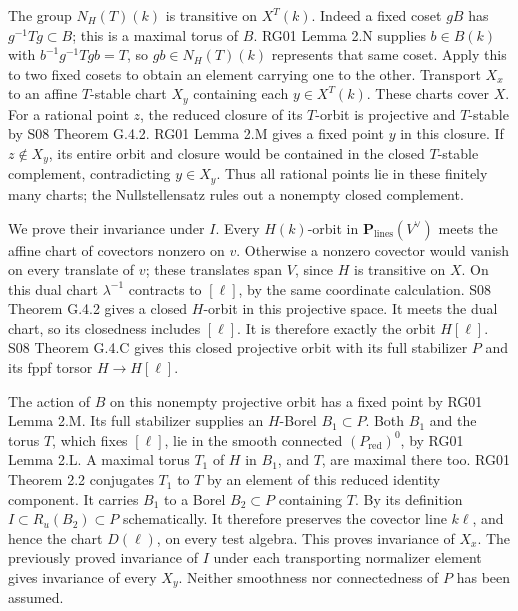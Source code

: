 \documentclass[11pt,a4paper,openany]{report}
\newcounter{none}
\begin{document}
The group \(N_H(T)(k)\) is transitive on \(X^T(k)\). Indeed a fixed coset \(gB\) has \(g^{-1}Tg\subset B\); this is a maximal torus of \(B\). RG01 Lemma 2.N supplies \(b\in B(k)\) with \(b^{-1}g^{-1}Tgb=T\), so \(gb\in N_H(T)(k)\) represents that same coset. Apply this to two fixed cosets to obtain an element carrying one to the other. Transport \(X_x\) to an affine \(T\)-stable chart \(X_y\) containing each \(y\in X^T(k)\). These charts cover \(X\). For a rational point \(z\), the reduced closure of its \(T\)-orbit is projective and \(T\)-stable by S08 Theorem G.4.2. RG01 Lemma 2.M gives a fixed point \(y\) in this closure. If \(z\notin X_y\), its entire orbit and closure would be contained in the closed \(T\)-stable complement, contradicting \(y\in X_y\). Thus all rational points lie in these finitely many charts; the Nullstellensatz rules out a nonempty closed complement.

We prove their invariance under \(I\). Every \(H(k)\)-orbit in \(\mathbf P_{\mathrm{lines}}(V^\vee)\) meets the affine chart of covectors nonzero on \(v\). Otherwise a nonzero covector would vanish on every translate of \(v\); these translates span \(V\), since \(H\) is transitive on \(X\). On this dual chart \(\lambda^{-1}\) contracts to \([\ell]\), by the same coordinate calculation. S08 Theorem G.4.2 gives a closed \(H\)-orbit in this projective space. It meets the dual chart, so its closedness includes \([\ell]\). It is therefore exactly the orbit \(H[\ell]\). S08 Theorem G.4.C gives this closed projective orbit with its full stabilizer \(P\) and its fppf torsor \(H\to H[\ell]\).

The action of \(B\) on this nonempty projective orbit has a fixed point by RG01 Lemma 2.M. Its full stabilizer supplies an \(H\)-Borel \(B_1\subset P\). Both \(B_1\) and the torus \(T\), which fixes \([\ell]\), lie in the smooth connected \((P_{\mathrm{red}})^0\), by RG01 Lemma 2.L. A maximal torus \(T_1\) of \(H\) in \(B_1\), and \(T\), are maximal there too. RG01 Theorem 2.2 conjugates \(T_1\) to \(T\) by an element of this reduced identity component. It carries \(B_1\) to a Borel \(B_2\subset P\) containing \(T\). By its definition \(I\subset R_u(B_2)\subset P\) schematically. It therefore preserves the covector line \(k\ell\), and hence the chart \(D(\ell)\), on every test algebra. This proves invariance of \(X_x\). The previously proved invariance of \(I\) under each transporting normalizer element gives invariance of every \(X_y\). Neither smoothness nor connectedness of \(P\) has been assumed.
\end{document}
